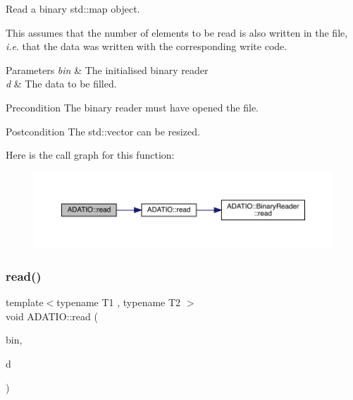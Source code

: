 Read a binary std\+::map object. 

This assumes that the number of elements to be read is also written in the file, {\itshape i.\+e}. that the data was written with the corresponding write code. 
\begin{DoxyParams}{Parameters}
{\em bin} & The initialised binary reader \\
\hline
{\em d} & The data to be filled.\\
\hline
\end{DoxyParams}
\begin{DoxyPrecond}{Precondition}
The binary reader must have opened the file. 
\end{DoxyPrecond}
\begin{DoxyPostcond}{Postcondition}
The std\+::vector can be resized. 
\end{DoxyPostcond}
Here is the call graph for this function\+:\nopagebreak
\begin{figure}[H]
\begin{center}
\leavevmode
\includegraphics[width=350pt]{d0/dba/namespaceADATIO_aae6ee71c391ad98e959febc86231331b_cgraph}
\end{center}
\end{figure}
\mbox{\label{namespaceADATIO_a746a6511817f141011d50005a099feec}} 
\subsubsection{\texorpdfstring{read()}{read()}\hspace{0.1cm}{\footnotesize\ttfamily [28/28]}}
{\footnotesize\ttfamily template$<$typename T1 , typename T2 $>$ \\
void A\+D\+A\+T\+I\+O\+::read (\begin{DoxyParamCaption}\item[{\mbox{\hyperlink{classADATIO_1_1BinaryReader}{Binary\+Reader}} \&}]{bin,  }\item[{std\+::pair$<$ T1, T2 $>$ \&}]{d }\end{DoxyParamCaption})\hspace{0.3cm}{\ttfamily [inline]}}



